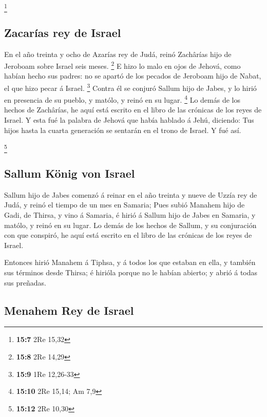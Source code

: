 \footnote{\textbf{15:7} 2Re 15,32}

\hypertarget{zacaruxedas-rey-de-israel}{%
\subsection{Zacarías rey de Israel}\label{zacaruxedas-rey-de-israel}}

 En el año treinta y ocho de Azarías rey de Judá, reinó
Zachârías hijo de Jeroboam sobre Israel seis meses. \footnote{\textbf{15:8}
  2Re 14,29}  E hizo lo malo en ojos de Jehová, como
habían hecho sus padres: no se apartó de los pecados de Jeroboam hijo de
Nabat, el que hizo pecar á Israel. \footnote{\textbf{15:9} 1Re 12,26-33}
 Contra él se conjuró Sallum hijo de Jabes, y lo hirió en
presencia de su pueblo, y matólo, y reinó en su lugar. \footnote{\textbf{15:10}
  2Re 15,14; Am 7,9}  Lo demás de los hechos de
Zachârías, he aquí está escrito en el libro de las crónicas de los reyes
de Israel.  Y esta fué la palabra de Jehová que había
hablado á Jehú, diciendo: Tus hijos hasta la cuarta generación se
sentarán en el trono de Israel. Y fué así.

\footnote{\textbf{15:12} 2Re 10,30}

\hypertarget{sallum-kuxf6nig-von-israel}{%
\subsection{Sallum König von Israel}\label{sallum-kuxf6nig-von-israel}}

 Sallum hijo de Jabes comenzó á reinar en el año treinta
y nueve de Uzzía rey de Judá, y reinó el tiempo de un mes en Samaria;
 Pues subió Manahem hijo de Gadi, de Thirsa, y vino á
Samaria, é hirió á Sallum hijo de Jabes en Samaria, y matólo, y reinó en
su lugar.  Lo demás de los hechos de Sallum, y su
conjuración con que conspiró, he aquí está escrito en el libro de las
crónicas de los reyes de Israel.

 Entonces hirió Manahem á Tiphsa, y á todos los que
estaban en ella, y también sus términos desde Thirsa; é hirióla porque
no le habían abierto; y abrió á todas sus preñadas.

\hypertarget{menahem-rey-de-israel}{%
\subsection{Menahem Rey de Israel}\label{menahem-rey-de-israel}}

